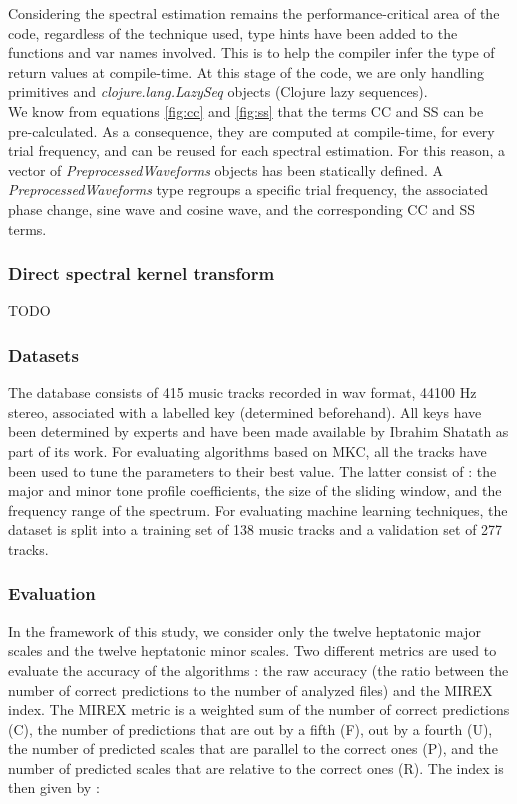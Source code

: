 \documentclass[letterpaper]{article}
\begin{document}
Considering the spectral estimation remains the performance-critical area of the code, regardless of the technique used, type hints have been added to the functions and var names involved. This is to help the compiler infer the type of return values at compile-time.
At this stage of the code, we are only handling primitives and \textit{clojure.lang.LazySeq} objects (Clojure lazy sequences).\\

We know from equations \ref{fig:cc} and \ref{fig:ss} that the terms CC and SS can be pre-calculated. As a consequence, they are computed at compile-time,
for every trial frequency, and can be reused for each spectral estimation. For this reason, a vector of \textit{PreprocessedWaveforms} objects has been statically defined. A \textit{PreprocessedWaveforms}
type regroups a specific trial frequency, the associated phase change, sine wave and cosine wave, and the corresponding CC and SS terms.\\

\subsubsection{Direct spectral kernel transform}

TODO

\subsubsection{Datasets}

The database consists of 415 music tracks recorded in wav format, 44100 Hz stereo, associated with a labelled key (determined beforehand). 
All keys have been determined
by experts and have been made available by Ibrahim Shat\textquotesingle ath as part of its work. For evaluating algorithms based on MKC,
all the tracks have been used to tune the parameters to their best value. The latter consist of : the major and minor tone profile coefficients,
the size of the sliding window, and the frequency range of the spectrum. For evaluating machine learning techniques,
the dataset is split into a training set of 138 music tracks and a validation set of 277 tracks.

\subsubsection{Evaluation}

In the framework of this study, we consider only the twelve heptatonic major scales and the twelve heptatonic minor scales.
Two different metrics are used to evaluate the accuracy of the algorithms :
the raw accuracy (the ratio between the number of correct predictions to the number of analyzed files) and the MIREX index.
The MIREX metric is a weighted sum of the number of correct predictions (C), the number of predictions that are out by a fifth (F), 
out by a fourth (U), the number of predicted scales that are parallel to the correct ones (P), and the number of predicted scales
that are relative to the correct ones (R). The index is then given by : \\
\end{document}
